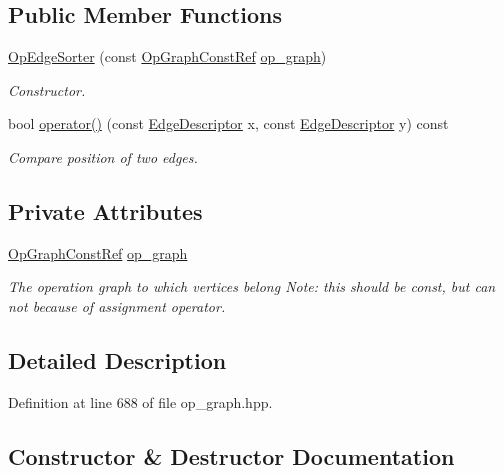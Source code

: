 \subsection*{Public Member Functions}
\begin{DoxyCompactItemize}
\item 
\hyperlink{classOpEdgeSorter_a74e36e6d9a2d66fb820046b0324fac46}{Op\+Edge\+Sorter} (const \hyperlink{op__graph_8hpp_a9a0b240622c47584bee6951a6f5de746}{Op\+Graph\+Const\+Ref} \hyperlink{classOpEdgeSorter_aaf40cdea9ead8a08f452e6cf6294ed7d}{op\+\_\+graph})
\begin{DoxyCompactList}\small\item\em Constructor. \end{DoxyCompactList}\item 
bool \hyperlink{classOpEdgeSorter_a2f4d4bf609dbfabf6a3d3e689d8e1cd6}{operator()} (const \hyperlink{graph_8hpp_a9eb9afea34e09f484b21f2efd263dd48}{Edge\+Descriptor} x, const \hyperlink{graph_8hpp_a9eb9afea34e09f484b21f2efd263dd48}{Edge\+Descriptor} y) const
\begin{DoxyCompactList}\small\item\em Compare position of two edges. \end{DoxyCompactList}\end{DoxyCompactItemize}
\subsection*{Private Attributes}
\begin{DoxyCompactItemize}
\item 
\hyperlink{op__graph_8hpp_a9a0b240622c47584bee6951a6f5de746}{Op\+Graph\+Const\+Ref} \hyperlink{classOpEdgeSorter_aaf40cdea9ead8a08f452e6cf6294ed7d}{op\+\_\+graph}
\begin{DoxyCompactList}\small\item\em The operation graph to which vertices belong Note\+: this should be const, but can not because of assignment operator. \end{DoxyCompactList}\end{DoxyCompactItemize}


\subsection{Detailed Description}


Definition at line 688 of file op\+\_\+graph.\+hpp.



\subsection{Constructor \& Destructor Documentation}
\mbox{\label{classOpEdgeSorter_a74e36e6d9a2d66fb820046b0324fac46}} 

